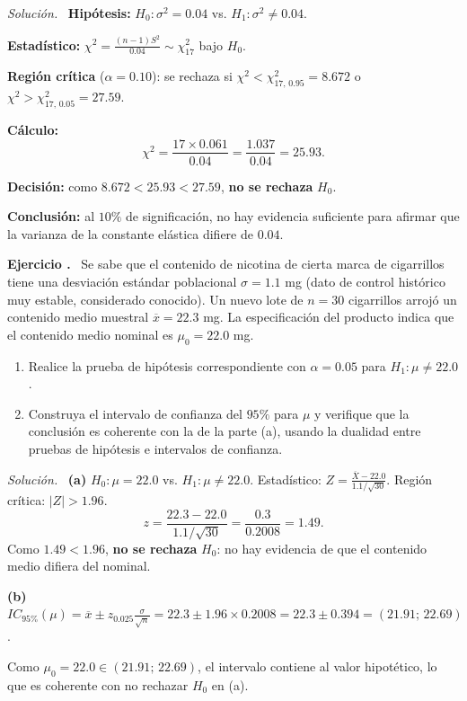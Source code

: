 \documentclass[11pt,a4paper]{article}
\newcounter{ejnum}
\newenvironment{ejercicio}{\refstepcounter{ejnum}\par\medskip\noindent\textbf{Ejercicio \theejnum.}~}{\par}
\newenvironment{solucion}{\par\noindent\textit{Solución.}~}{\par\vspace{1em}}
\begin{document}
\begin{solucion}
\textbf{Hipótesis:} $H_0:\sigma^2=0.04$ vs. $H_1:\sigma^2\neq0.04$.

\textbf{Estadístico:} $\displaystyle \chi^2=\frac{(n-1)S^2}{0.04}\sim\chi^2_{17}$ bajo $H_0$.

\textbf{Región crítica} ($\alpha=0.10$): se rechaza si $\chi^2<\chi^2_{17,\,0.95}=8.672$ o $\chi^2>\chi^2_{17,\,0.05}=27.59$.

\textbf{Cálculo:}
\[
\chi^2=\frac{17\times0.061}{0.04}=\frac{1.037}{0.04}=25.93.
\]

\textbf{Decisión:} como $8.672<25.93<27.59$, \textbf{no se rechaza} $H_0$.

\textbf{Conclusión:} al $10\%$ de significación, no hay evidencia suficiente para afirmar que la varianza de la constante elástica difiere de $0.04$.
\end{solucion}

\begin{ejercicio}
Se sabe que el contenido de nicotina de cierta marca de cigarrillos tiene una desviación estándar poblacional $\sigma=1.1$ mg (dato de control histórico muy estable, considerado conocido). Un nuevo lote de $n=30$ cigarrillos arrojó un contenido medio muestral $\overline{x}=22.3$ mg. La especificación del producto indica que el contenido medio nominal es $\mu_0=22.0$ mg.
\begin{enumerate}[label=(\alph*)]
\item Realice la prueba de hipótesis correspondiente con $\alpha=0.05$ para $H_1:\mu\neq22.0$.
\item Construya el intervalo de confianza del $95\%$ para $\mu$ y verifique que la conclusión es coherente con la de la parte (a), usando la dualidad entre pruebas de hipótesis e intervalos de confianza.
\end{enumerate}
\end{ejercicio}

\begin{solucion}
\textbf{(a)} $H_0:\mu=22.0$ vs. $H_1:\mu\neq22.0$. Estadístico: $\displaystyle Z=\frac{\overline{X}-22.0}{1.1/\sqrt{30}}$. Región crítica: $|Z|>1.96$.
\[
z=\frac{22.3-22.0}{1.1/\sqrt{30}}=\frac{0.3}{0.2008}=1.49.
\]
Como $1.49<1.96$, \textbf{no se rechaza} $H_0$: no hay evidencia de que el contenido medio difiera del nominal.

\textbf{(b)} $\displaystyle IC_{95\%}(\mu)=\overline{x}\pm z_{0.025}\frac{\sigma}{\sqrt{n}}=22.3\pm1.96\times0.2008=22.3\pm0.394=(21.91;\,22.69)$.

Como $\mu_0=22.0\in(21.91;\,22.69)$, el intervalo contiene al valor hipotético, lo que es coherente con no rechazar $H_0$ en (a).
\end{solucion}
\end{document}
